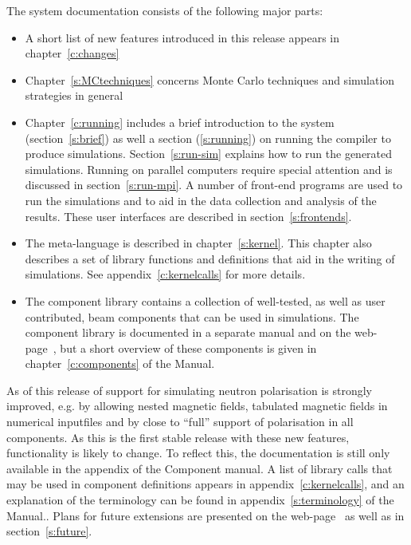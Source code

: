 The \MCS system documentation consists of the following major
parts:
\begin{itemize}
\item A short list of new features introduced in this \MCS release
  appears in chapter~\ref{c:changes}
\item Chapter~\ref{s:MCtechniques} concerns Monte Carlo techniques
  and simulation strategies in general
\item Chapter~\ref{c:running} includes a brief introduction to the
  \MCS system
  (section~\ref{s:brief}) as well a section (\ref{s:running}) on running the compiler to produce
  simulations. Section~\ref{s:run-sim} explains how to run the generated
  simulations. Running \MCS on parallel computers require special
  attention and is discussed in section~\ref{s:run-mpi}. A number of front-end programs are used to run the
  simulations and to aid in the data collection and analysis of the
  results. These user interfaces are described in section~\ref{s:frontends}.
\item The \MCS meta-language is described in chapter~\ref{s:kernel}. This
  chapter also describes a set of library functions and definitions
  that aid in the writing of simulations. See
  appendix~\ref{c:kernelcalls} for more details.
\item The \MCS component library contains a collection of
  well-tested, as well as user contributed, beam components that can be used in simulations.
  The \MCS component library is documented in a separate manual
  and on the \MCS web-page~\cite{mcstas_webpage}, but a short overview of these
  components is given in chapter~\ref{c:components} of the Manual.

\end{itemize}

As of this release of \MCS support for simulating neutron
polarisation is strongly improved, e.g. by allowing nested magnetic
fields, tabulated magnetic fields in numerical inputfiles and by close
to ``full'' support of polarisation in all components. As this is the
first stable release with these new features, functionality is likely to change. To reflect this, the
documentation is still only available in the appendix of the Component manual. %
A list of library calls that may be used in component definitions
appears in appendix~\ref{c:kernelcalls}, and
an explanation of the \MCS terminology can be
found in appendix~\ref{s:terminology} of the Manual..
Plans for future extensions are presented on the \MCS web-page~\cite{mcstas_webpage} as well as in section~\ref{s:future}.


